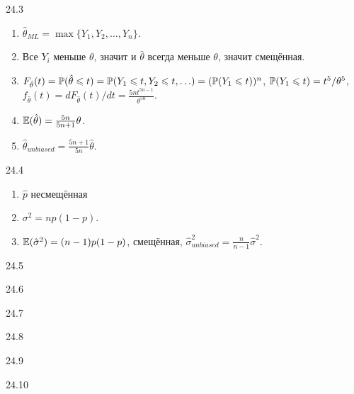 \protect \hypertarget {soln:24.3}{}
\begin{solution}{{24.3}}
\begin{enumerate}
\item $\hat\theta_{ML} = \max\{ Y_1, Y_2, \ldots, Y_n\}$.
\item Все $Y_i$ меньше $\theta$, значит и $\hat\theta$ всегда меньше $\theta$, значит смещённая.
\item $F_{\hat\theta}(t) = \P(\hat\theta \leq t) = \P(Y_1 \leq t, Y_2 \leq t, \ldots) = (\P(Y_1 \leq t))^n$, $\P(Y_1 \leq t) = t^5/\theta^5$, $f_{\hat\theta}(t) = dF_{\hat\theta}(t)/dt = \frac{5n t^{5n-1}}{\theta^{5n}}$.
\item $\E(\hat\theta) = \frac{5n}{5n+1}\theta$.
\item $\hat\theta_{unbiased} = \frac{5n+1}{5n}\hat\theta$.
\end{enumerate}
\end{solution}
\protect \hypertarget {soln:24.4}{}
\begin{solution}{{24.4}}
\begin{enumerate}
  \item $\hat p$ несмещённая
  \item $\sigma^2 = n p(1-p)$.
  \item $\E(\hat\sigma^2) = (n-1)p(1-p)$, смещённая, $\hat\sigma^2_{unbiased} = \frac{n}{n-1} \hat\sigma^2$.
\end{enumerate}
\end{solution}
\protect \hypertarget {soln:24.5}{}
\begin{solution}{{24.5}}

\end{solution}
\protect \hypertarget {soln:24.6}{}
\begin{solution}{{24.6}}

\end{solution}
\protect \hypertarget {soln:24.7}{}
\begin{solution}{{24.7}}

\end{solution}
\protect \hypertarget {soln:24.8}{}
\begin{solution}{{24.8}}

\end{solution}
\protect \hypertarget {soln:24.9}{}
\begin{solution}{{24.9}}

\end{solution}
\protect \hypertarget {soln:24.10}{}
\begin{solution}{{24.10}}

\end{solution}
